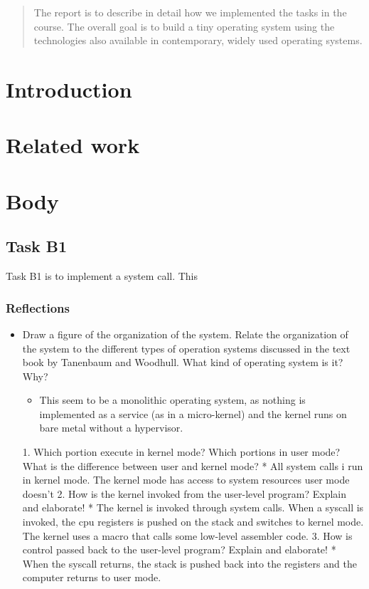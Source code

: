 \documentclass[10pt,a4paper]{report}
\begin{document}

\tableofcontents

\begin{abstract}
The report is to describe in detail how we implemented the tasks in the course. The overall goal is to build a tiny operating system using the technologies also available in contemporary, widely used operating systems.
\end{abstract}

\chapter{Introduction}

\chapter{Related work}


\chapter{Body}
\section{Task B1}
Task B1 is to implement a system call. This 

\subsection{Reflections}

\begin{itemize}
  \item Draw a figure of the organization of the system. Relate the organization of the system to the different types of operation systems discussed in the text book by Tanenbaum and Woodhull. What kind of operating system is it? Why?
\begin{itemize}
  \item 	This seem to be a monolithic operating system, as nothing is implemented as a service (as in a micro-kernel) and the kernel runs on bare metal without a hypervisor.
\end{itemize}
   1.
      Which portion execute in kernel mode? Which portions in user mode? What is the difference between user and kernel mode?
          *
            All system calls i run in kernel mode. The kernel mode has access to system resources user mode doesn't
   2.
      How is the kernel invoked from the user-level program? Explain and elaborate!
          *
            The kernel is invoked through system calls. When a syscall is invoked, the cpu registers is pushed on the stack and switches to kernel mode. The kernel uses a macro that calls some low-level assembler code.
   3.
      How is control passed back to the user-level program? Explain and elaborate!
          *
            When the syscall returns, the stack is pushed back into the registers and the computer returns to user mode.

\end{itemize}
\end{document}
